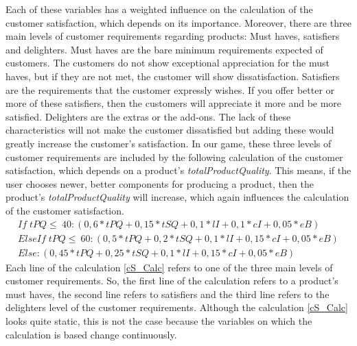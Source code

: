 Each of these variables has a weighted influence on the calculation of the customer satisfaction, which depends on its importance.
Moreover, there are three main levels of customer requirements regarding products: Must haves, satisfiers and delighters. \cite[p.~3f]{krienke_messung_2009}
Must haves are the bare minimum requirements expected of customers. The customers do not show exceptional appreciation for the must haves, but if they are not met, the customer will show dissatisfaction. Satisfiers are the requirements that the customer expressly wishes. If you offer better or more of these satisfiers, then the customers will appreciate it more and be more satisfied. Delighters are the extras or the add-ons. The lack of these characteristics will not make the customer dissatisfied but adding these would greatly increase the customer's satisfaction. In our game, these three levels of customer requirements are included by the following calculation of the customer satisfaction, which depends on a product's \textit{totalProductQuality}. This means, if the user chooses newer, better components for producing a product, then the product's \textit{totalProductQuality} will increase, which again influences the calculation of the customer satisfaction.
    \begin{equation}
    \label{cS_Calc}
    \begin{aligned}
    If \; tPQ \leq \ 40: (0,6*tPQ + 0,15*tSQ + 0,1*lI + 0,1*cI + 0,05*eB)\\
    ElseIf \; tPQ \leq \ 60: (0,5*tPQ + 0,2*tSQ + 0,1*lI + 0,15*cI + 0,05*eB)\\
    Else: (0,45*tPQ + 0,25*tSQ + 0,1*lI + 0,15*cI + 0,05*eB)
    \end{aligned}
    \end{equation}
Each line of the calculation \ref{cS_Calc} refers to one of the three main levels of customer requirements. So, the first line of the calculation refers to a product's must haves, the second line refers to satisfiers and the third line refers to the delighters level of the customer requirements.
Although the calculation \ref{cS_Calc} looks quite static, this is not the case because the variables on which the calculation is based change continuously.
    
